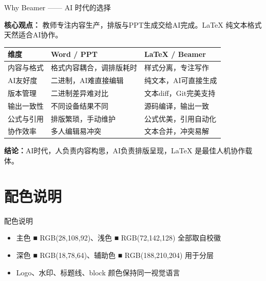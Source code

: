 \documentclass{beamer}
\begin{document}
\begin{frame}{Why Beamer —— AI 时代的选择}

    {\small\bfseries 核心观点：} 教师专注内容生产，排版与PPT生成交给AI完成。\LaTeX{} 纯文本格式天然适合AI协作。

    \vspace{0.3em}
    \begin{table}[h]
        \centering
        \footnotesize
        \begin{tabular}{p{0.18\paperwidth}p{0.28\paperwidth}p{0.28\paperwidth}}
            \toprule
            \textbf{维度} & \textbf{Word / PPT} & \textbf{\LaTeX{} / Beamer} \\ \midrule
            内容与格式 & 格式内容耦合，调排版耗时 & 样式分离，专注写作 \\
            AI友好度 & 二进制，AI难直接编辑 & 纯文本，AI可直接生成 \\
            版本管理 & 二进制差异难对比 & 文本diff，Git完美支持 \\
            输出一致性 & 不同设备结果不同 & 源码编译，输出一致 \\
            公式与引用 & 排版繁琐，手动维护 & 公式优美，引用自动化 \\
            协作效率 & 多人编辑易冲突 & 文本合并，冲突易解 \\
            \bottomrule
        \end{tabular}
    \end{table}

    \vspace{0.2em}
    {\small\textbf{结论：}AI时代，人负责内容构思，AI负责排版呈现，\LaTeX{} 是最佳人机协作载体。}
\end{frame}



\section{配色说明}

\begin{frame}{配色说明}
    \begin{itemize}
        \item 主色 \textcolor{sicau}{■ RGB(28,108,92)}、浅色 \textcolor{sicauLight}{■ RGB(72,142,128)} 全部取自校徽
        \item 深色 \textcolor{sicauDark}{■ RGB(18,78,64)}、辅助色 \textcolor{sicauVeryLight}{■ RGB(188,210,204)} 用于分层
        \item Logo、水印、标题线、block 颜色保持同一视觉语言
    \end{itemize}
\end{frame}
\end{document}
